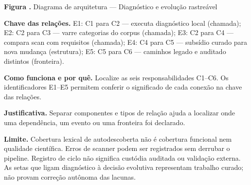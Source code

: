 {\small\textbf{Figura \thefigure.} Diagrama de arquitetura --- Diagnóstico e evolução rastreável}\par\smallskip
{\footnotesize\textbf{Chave das relações.} E1: C1 para C2 --- executa diagnóstico local (chamada); E2: C2 para C3 --- varre categorias do corpus (chamada); E3: C2 para C4 --- compara scan com requisitos (chamada); E4: C4 para C5 --- subsídio curado para nova mudança (estrutura); E5: C5 para C6 --- caminhos legado e auditado distintos (fronteira).}\par\smallskip
\noindent\textbf{Como funciona e por quê.} Localize as seis responsabilidades C1--C6. Os identificadores E1--E5 permitem conferir o significado de cada conexão na chave das relações.\par
\noindent\textbf{Justificativa.} Separar componentes e tipos de relação ajuda a localizar onde uma dependência, um evento ou uma fronteira foi declarado.\par
\noindent\textbf{Limite.} Cobertura lexical de autodescoberta não é cobertura funcional nem qualidade científica. Erros de scanner podem ser registrados sem derrubar o pipeline. Registro de ciclo não significa custódia auditada ou validação externa. As setas que ligam diagnóstico à decisão evolutiva representam trabalho curado; não provam correção autônoma das lacunas.\par\smallskip
{}
